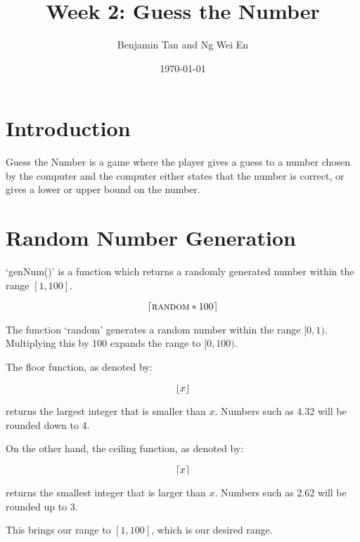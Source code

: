 \documentclass{article}
\title{Week 2: Guess the Number}
\author{Benjamin Tan and Ng Wei En}
\date{\today}
\DeclarePairedDelimiter{\floor}{\lfloor}{\rfloor}
\DeclarePairedDelimiter{\ceil}{\lceil}{\rceil}
\begin{document}
\maketitle

\section{Introduction}

Guess the Number is a game where the player gives a guess to a number chosen by the computer and the computer either states that the number is correct, or gives a lower or upper bound on the number.

\section{Random Number Generation}

`genNum()' is a function which returns a randomly generated number within the range $[1, 100]$.

$$\ceil{\Call{random}{} * 100}$$

The function `random' generates a random number within the range $[0, 1)$. Multiplying this by 100 expands the range to $[0, 100)$.

The floor function, as denoted by:

$$\floor{x}$$

returns the largest integer that is smaller than $x$. Numbers such as 4.32 will be rounded down to 4.

On the other hand, the ceiling function, as denoted by:

$$\ceil{x}$$

returns the smallest integer that is larger than $x$. Numbers such as 2.62 will be rounded up to 3.

This brings our range to $[1, 100]$, which is our desired range.
\end{document}
